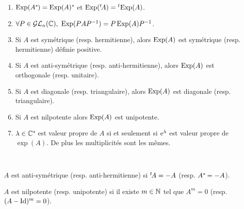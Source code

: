 \begin{prop}
 \begin{enumerate}
  \item $\operatorname{Exp}(A^{*}\hspace{-0.1em}) = \operatorname{Exp}(A)^{*}\hspace{-0.1em}$ et $\operatorname{Exp}({}^t\! A) = {}^t\! \operatorname{Exp}(A)$.
  \item $\forall P\in\mathcal{GL}_n(\mathbb{C}),\ \operatorname{Exp}(PAP^{-1}) = P\operatorname{Exp}(A)P^{-1}$.
  \item Si $A$ est symétrique (resp. hermitienne), alors $\operatorname{Exp}(A)$ est
symétrique (resp. hermitienne) définie positive.
  \item Si $A$ est anti-symétrique (resp. anti-hermitienne), alors $\operatorname{Exp}(A)$ est
orthogonale (resp. unitaire).
  \item Si $A$ est diagonale (resp. triangulaire), alors $\operatorname{Exp}(A)$ est
diagonale (resp. triangulaire).
  \item Si $A$ est nilpotente alors $\operatorname{Exp}(A)$ est unipotente.
  \item $\lambda\in\mathbb{C}^{*}\hspace{-0.1em}$ est valeur propre de $A$ si et seulement si
$\operatorname{e}^\lambda$ est valeur propre de $\exp(A)$. De plus les multiplicités sont les
mêmes.
 \end{enumerate}
\end{prop}

\begin{example}[Rappels] \

$A$ est anti-symétrique (resp. anti-hermitienne) si ${}^t\! A = -A$ (resp. $A^{*}\hspace{-0.1em} =
-A$).

$A$ est nilpotente (resp. unipotente) si il existe $m\in\mathbb{N}$ tel que $A^m = 0$
(resp. $(A-\operatorname{Id})^m =0$).
\end{example}

